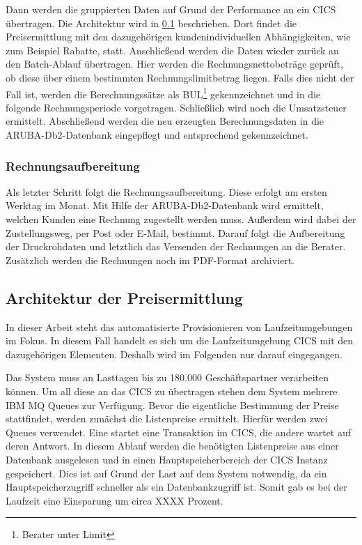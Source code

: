Dann werden die gruppierten Daten auf Grund der Performance an ein CICS übertragen.
Die Architektur wird in \ref{rechArch} beschrieben.
Dort findet die Preisermittlung mit den dazugehörigen kundenindividuellen Abhängigkeiten, wie zum Beispiel Rabatte, statt.
Anschließend werden die Daten wieder zurück an den Batch-Ablauf übertragen.
Hier werden die Rechnungsnettobeträge geprüft, ob diese über einem bestimmten Rechnungslimitbetrag liegen.
Falls dies nicht der Fall ist, werden die Berechnungssätze als BUL\footnote{Berater unter Limit} gekennzeichnet und in die folgende Rechnungsperiode vorgetragen.
Schließlich wird noch die Umsatzsteuer ermittelt.
Abschließend werden die neu erzeugten Berechnungsdaten in die ARUBA-Db2-Datenbank eingepflegt und entsprechend gekennzeichnet.

\subsubsection{Rechnungsaufbereitung}
Als letzter Schritt folgt die Rechnungsaufbereitung.
Diese erfolgt am ersten Werktag im Monat.
Mit Hilfe der ARUBA-Db2-Datenbank wird ermittelt, welchen Kunden eine Rechnung zugestellt werden muss.
Außerdem wird dabei der Zustellungsweg, per Post oder E-Mail, bestimmt.
Darauf folgt die Aufbereitung der Druckrohdaten und letztlich das Versenden der Rechnungen an die Berater.
Zusätzlich werden die Rechnungen noch im PDF-Format archiviert.

\subsection{Architektur der Preisermittlung}\label{rechArch}
In dieser Arbeit steht das automatisierte Provisionieren von Laufzeitumgebungen im Fokus.
In diesem Fall handelt es sich um die Laufzeitumgebung CICS mit den dazugehörigen Elementen.
Deshalb wird im Folgenden nur darauf eingegangen.

Das System muss an Lasttagen bis zu 180.000 Geschäftspartner verarbeiten können.
Um all diese an das CICS zu übertragen stehen dem System mehrere IBM MQ Queues zur Verfügung.
Bevor die eigentliche Bestimmung der Preise stattfindet, werden zunächst die Listenpreise ermittelt.
Hierfür werden zwei Queues verwendet.
Eine startet eine Transaktion im CICS, die andere wartet auf deren Antwort.
In diesem Ablauf werden die benötigten Listenpreise aus einer Datenbank ausgelesen und in einen Hauptspeicherbereich der CICS Instanz gespeichert.
Dies ist auf Grund der Last auf dem System notwendig, da ein Hauptspeicherzugriff schneller als ein Datenbankzugriff ist.
Somit gab es bei der Laufzeit eine Einsparung um circa XXXX Prozent.

